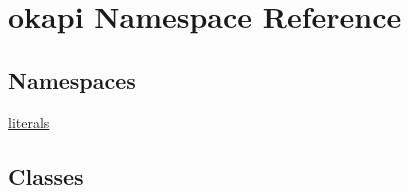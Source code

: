 \hypertarget{namespaceokapi}{}\section{okapi Namespace Reference}
\label{namespaceokapi}
\subsection*{Namespaces}
\begin{DoxyCompactItemize}
\item 
 \mbox{\hyperlink{namespaceokapi_1_1literals}{literals}}
\end{DoxyCompactItemize}
\subsection*{Classes}
